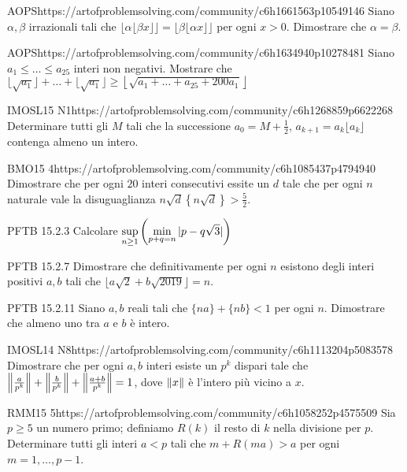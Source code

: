 \documentclass[12pt]{article}
\begin{document}
\begin{esercizio}{AOPS}{https://artofproblemsolving.com/community/c6h1661563p10549146}
    Siano $\alpha,\beta$ irrazionali tali che $\lfloor \alpha\lfloor \beta x \rfloor \rfloor = \lfloor \beta\lfloor \alpha x \rfloor \rfloor$ per ogni $x>0$. Dimostrare che $\alpha=\beta$.
\end{esercizio}

\begin{esercizio}{AOPS}{https://artofproblemsolving.com/community/c6h1634940p10278481}
    Siano $a_1\le\dots\le a_{25}$ interi non negativi. Mostrare che $\lfloor \sqrt{a_1} \rfloor+\dots+\lfloor \sqrt{a_1} \rfloor\ge\left\lfloor \sqrt{a_1+\dots+a_{25}+200a_1} \right\rfloor$
\end{esercizio}

\begin{esercizio}{IMOSL15 N1}{https://artofproblemsolving.com/community/c6h1268859p6622268}
    Determinare tutti gli $M$ tali che la successione $a_0=M+\frac1 2$, $a_{k+1}=a_k\lfloor a_k\rfloor$ contenga almeno un intero.
\end{esercizio}

\begin{esercizio}{BMO15 4}{https://artofproblemsolving.com/community/c6h1085437p4794940}
    Dimostrare che per ogni $20$ interi consecutivi essite un $d$ tale che per ogni $n$ naturale vale la disuguaglianza $n\sqrt d\left\{ n\sqrt d \right\}>\frac 5 2$.
\end{esercizio}

\begin{esercizio}{PFTB 15.2.3}{}
    Calcolare $\displaystyle\sup_{n\ge1}\left( \min_{p+q=n} |p-q\sqrt3| \right)$
\end{esercizio}

\begin{esercizio}{PFTB 15.2.7}{}
    Dimostrare che definitivamente per ogni $n$ esistono degli interi positivi $a,b$ tali che $\lfloor a\sqrt2+b\sqrt{2019} \rfloor=n$.
\end{esercizio}

\begin{esercizio}{PFTB 15.2.11}{}
    Siano $a,b$ reali tali che $\{na\}+\{nb\}<1$ per ogni $n$. Dimostrare che almeno uno tra $a$ e $b$ è intero.
\end{esercizio}

\begin{esercizio}{IMOSL14 N8}{https://artofproblemsolving.com/community/c6h1113204p5083578}
    Dimostrare che per ogni $a,b$ interi esiste un $p^k$ dispari tale che $\left\lVert\frac{a}{p^k}\right\rVert+\left\lVert\frac{b}{p^k}\right\rVert+\left\lVert\frac{a+b}{p^k}\right\rVert=1$, dove $\left\lVert x\right\rVert$ è l'intero più vicino a $x$.
\end{esercizio}

\begin{esercizio}{RMM15 5}{https://artofproblemsolving.com/community/c6h1058252p4575509}
    Sia $p\ge5$ un numero primo; definiamo $R(k)$ il resto di $k$ nella divisione per $p$. Determinare tutti gli interi $a<p$ tali che $m+R(ma)>a$ per ogni $m=1,\dots,p-1$.
\end{esercizio}
\end{document}
